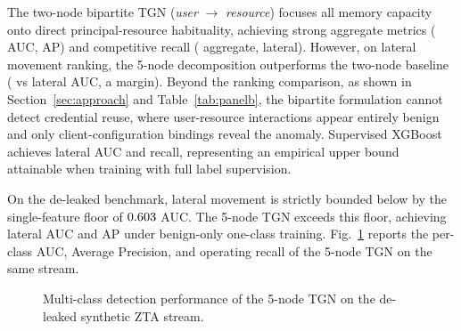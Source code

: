 The two-node bipartite TGN (\textit{user} $\rightarrow$ \textit{resource}) focuses all memory
capacity onto direct principal-resource habituality, achieving strong aggregate metrics
(\AggAucTGNii{} AUC, \AggApTGNii{} AP) and competitive recall (\AggRecTGNii{} aggregate,
\LatRecTGNii{} lateral). However, on lateral movement ranking, the 5-node decomposition
outperforms the two-node baseline (\LatAucTGN{} vs \LatAucTGNii{} lateral AUC, a \LatAucDeltaTGNii{} margin).
Beyond the ranking comparison, as shown in Section~\ref{sec:approach} and Table~\ref{tab:panelb},
the bipartite formulation cannot detect credential reuse, where user-resource interactions
appear entirely benign and only client-configuration bindings reveal the anomaly.
Supervised XGBoost achieves \LatAucXGB{} lateral AUC and \LatRecXGB{} recall, representing
an empirical upper bound attainable when training with full label supervision.

On the de-leaked benchmark, lateral movement is strictly bounded below by the single-feature
floor of $0.603$ AUC. The 5-node TGN exceeds this floor, achieving \LatAucTGN{}
lateral AUC and \LatApTGN{} AP under benign-only one-class training.
Fig.~\ref{fig:perf_bars} reports the per-class AUC, Average Precision, and operating
recall of the 5-node TGN on the same stream.

\begin{figure}[ht!]
\centering
{}
\caption{Multi-class detection performance of the 5-node TGN on the de-leaked synthetic ZTA stream.}
\label{fig:perf_bars}
\end{figure}

